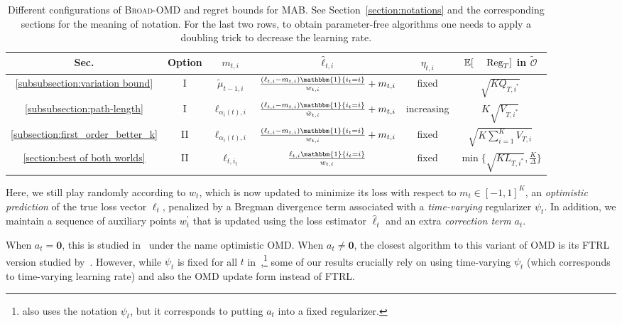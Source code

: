 \documentclass[final, 12pt]{colt2018} %
\newcommand{\p}{\prime}
\newcommand{\reg}{\text{\rm Reg}}
\begin{document}
 \renewcommand{\arraystretch}{1.4}
\begin{table}[t] 
  \centering
  \caption{Different configurations of \textsc{Broad-OMD} and regret bounds for MAB. 
  See Section~\ref{section:notations} and the corresponding sections for the meaning of notation. 
  For the last two rows, to obtain parameter-free algorithms one needs to apply a doubling trick to decrease the learning rate.}
  \begin{threeparttable}
  \begin{tabular}{ | c | c | c | c | c | c | }
    \hline
    Sec. & Option & $m_{t,i}$ & $\hat{\ell}_{t,i}$ & $\eta_{t,i}$ & $\mathbb{E}[\reg_T]$ in $\tilde{\mathcal{O}}$ \\ \hline
    \ref{subsubsection:variation bound} & I & $\tilde{\mu}_{t-1,i}$ & $\frac{(\ell_{t,i}-m_{t,i})\mathbbm{1}\{i_t=i\}}{w_{t,i}}+m_{t,i}$ & fixed & $\sqrt{KQ_{T,i^*}}$ \\ \hline
    \ref{subsubsection:path-length} &  I & $\ell_{\alpha_i(t),i}$ & $\frac{(\ell_{t,i}-m_{t,i})\mathbbm{1}\{i_t=i\}}{\bar{w}_{t,i}}+m_{t,i}$ & increasing & $K\sqrt{V_{T,i^*}}$ \\ \hline
    \ref{subsection:first_order_better_k} & II & $\ell_{\alpha_i(t),i}$ & $\frac{(\ell_{t,i}-m_{t,i})\mathbbm{1}\{i_t=i\}}{w_{t,i}}+m_{t,i}$ & fixed & $ \sqrt{K\sum_{i=1}^K V_{T,i}}$ \\  \hline
   \ref{section:best of both worlds} & II & $\ell_{t,i_t}$ &  $\frac{\ell_{t,i}\mathbbm{1}\{i_t=i\}}{w_{t,i}}$ & fixed & $\min\{ \sqrt{KL_{T,i^*}}, \frac{K}{\Delta}\}$ \\ \hline
  \end{tabular}
  \end{threeparttable}
  \label{table:summary}
\end{table}

Here, we still play randomly according to $w_t$, which is now updated to minimize its loss with respect to $m_t \in [-1,1]^K$, 
an {\it optimistic prediction} of the true loss vector $\ell_t$,
penalized by a Bregman divergence term associated with a {\it time-varying} regularizer $\psi_t$.
In addition, we maintain a sequence of auxiliary points $w_t^\p$ that is updated using the loss estimator $\hat{\ell}_t$ and an extra {\it correction term} $a_t$.

When $a_t = \mathbf{0}$, this is studied in~\citep{rakhlin2013online} under the name optimistic OMD. 
When $a_t \neq \mathbf{0}$, the closest algorithm to this variant of OMD is its FTRL version studied by~\citet{steinhardt2014adaptivity}.
However, while $\psi_t$ is fixed for all $t$ in~\citep{steinhardt2014adaptivity},\footnote{%
\citet{steinhardt2014adaptivity} also uses the notation $\psi_t$, but it corresponds to putting $a_t$ into a fixed regularizer.}
some of our results crucially rely on using time-varying $\psi_t$ (which corresponds to time-varying learning rate)
and also the OMD update form instead of FTRL. 
\end{document}
